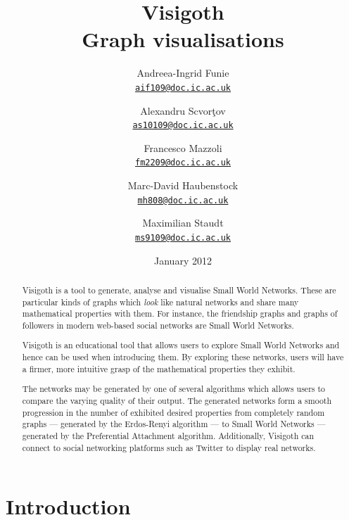 \documentclass[a4paper,11pt,titlepage]{article}
\newcommand{\mailto}[1]{\href{mailto:#1}{\texttt{#1}}}
\let\stdsection\section         %
\renewcommand{\section}{\newpage\stdsection}
\begin{document}
\title{\Huge Visigoth\\\Large Graph visualisations}
\author{
  Andreea-Ingrid Funie\\\mailto{aif109@doc.ic.ac.uk}\and
  Alexandru Scvor\c tov\\\mailto{as10109@doc.ic.ac.uk}\and
  Francesco Mazzoli\\\mailto{fm2209@doc.ic.ac.uk}\and
  Marc-David Haubenstock\\\mailto{mh808@doc.ic.ac.uk}\and
  Maximilian Staudt\\\mailto{ms9109@doc.ic.ac.uk}
}
\date{January 2012}
\maketitle

\begin{abstract}

Visigoth is a tool to generate, analyse and visualise Small World
Networks. These are particular kinds of graphs which \emph{look} like
natural networks and share many mathematical properties with them.
For instance, the friendship graphs and graphs of followers in modern
web-based social networks are Small World Networks.

Visigoth is an educational tool that allows users to explore Small
World Networks and hence can be used when introducing them. By
exploring these networks, users will have a firmer, more intuitive
grasp of the mathematical properties they exhibit.

The networks may be generated by one of several algorithms which
allows users to compare the varying quality of their output. The
generated networks form a smooth progression in the number of
exhibited desired properties from completely random graphs ---
generated by the Erdos-Renyi algorithm --- to Small World Networks ---
generated by the Preferential Attachment algorithm. Additionally,
Visigoth can connect to social networking platforms such as Twitter to
display real networks.
\end{abstract}

\tableofcontents




\section{Introduction}

\end{document}
